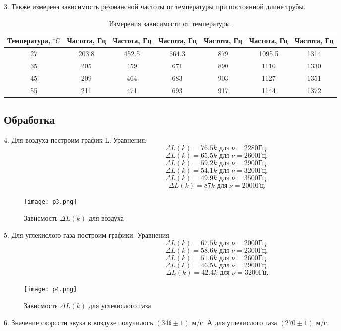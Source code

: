 3. Также измерена зависимость резонансной частоты от температуры при постоянной длине трубы.

\begin{table}[h]
    \centering
    \begin{tabular}{|c|c|c|c|c|c|c|}
    \hline
    Температура, $^\circ C$ & Частота, Гц & Частота, Гц & Частота, Гц & Частота, Гц & Частота, Гц & Частота, Гц \\
    \hline
    27 & 203.8 & 452.5 & 664.3 & 879 & 1095.5 & 1314 \\
    \hline
    35 & 205 & 459 & 671 & 890 & 1110 & 1330 \\
    \hline
    45 & 209 & 464 & 683 & 903 & 1127 & 1351 \\
    \hline
    55 & 211 & 471 & 693 & 917 & 1144 & 1372 \\
    \hline
    \end{tabular}
    \caption{Измерения зависимости от температуры.}
\end{table}

\subsection{Обработка}

4. Для воздуха построим график L. Уравнения:
\[\Delta L(k) = 76.5k \text{ для }\nu = 2280 \text {Гц},\]
\[\Delta L(k) = 65.5k \text{ для }\nu = 2600 \text {Гц},\]
\[\Delta L(k) = 59.2k \text{ для }\nu = 2900 \text {Гц},\]
\[\Delta L(k) = 54.1k \text{ для }\nu = 3200 \text {Гц},\]
\[\Delta L(k) = 49.9k \text{ для }\nu = 3500 \text {Гц},\]
\[\Delta L(k) = 87k \text{ для }\nu = 2000 \text {Гц}.\]
\begin{figure}
    \centering
    \texttt{[image: p3.png]}
    \caption{Зависмость $\Delta L(k)$ для воздуха}
\end{figure}

5. Для углекислого газа построим графики. Уравнения:
\[\Delta L(k) = 67.5k \text{ для }\nu = 2000 \text {Гц},\]
\[\Delta L(k) = 58.6k \text{ для }\nu = 2300 \text {Гц},\]
\[\Delta L(k) = 51.6k \text{ для }\nu = 2600 \text {Гц},\]
\[\Delta L(k) = 46.5k \text{ для }\nu = 2900 \text {Гц},\]
\[\Delta L(k) = 42.4k \text{ для }\nu = 3200 \text {Гц}.\]
\begin{figure}
    \centering
    \texttt{[image: p4.png]}
    \caption{Зависмость $\Delta L(k)$ для углекислого газа}
\end{figure}

6. Значение скорости звука в воздухе получилось $(346 \pm 1)$ м/с. А для углекислого газа $(270 \pm 1)$ м/с.


